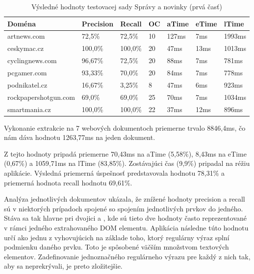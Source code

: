 \begin{table}[hbt]
\caption{Výsledné hodnoty testovacej sady Správy a novinky (prvá časť)}
\centering
\begin{tabular}{|l|l|l|l|l|l|l|}
\hline
\textbf{Doména}          & \textbf{Precision} & \textbf{Recall}  & \textbf{OC}  & \textbf{aTime} & \textbf{eTime} & \textbf{lTime}  \\ \hline
artnews.com             & 72,5\%    & 72,5\%  & 10 & 127ms & 7ms   & 1993ms \\ \hline
ceskymac.cz             & 100,0\%   & 100,0\% & 20 & 47ms  & 13ms  & 1013ms \\ \hline
cyclingnews.com         & 96,67\%   & 72,5\%  & 20 & 88ms  & 7ms   & 781ms  \\ \hline
pcgamer.com             & 93,33\%   & 70,0\%  & 20 & 84ms  & 7ms   & 778ms  \\ \hline
podnikatel.cz           & 16,67\%   & 3,25\%  & 8  & 47ms  & 6ms   & 923ms  \\ \hline
rockpapershotgun.com    & 69,0\%    & 69,0\%  & 25 & 70ms  & 7ms   & 1034ms \\ \hline
smartmania.cz           & 100,0\%   & 100,0\% & 22 & 37ms  & 12ms  & 896ms  \\ \hline
\end{tabular}
\end{table}

Vykonanie extrakcie na 7 webových dokumentoch priemerne trvalo 8846,4ms, čo nám dáva hodnotu 1263,77ms na jeden dokument. 

Z tejto hodnoty pripadá priemerne 70,43ms na aTime (5,58\%), 8,43ms na eTime (0,67\%) a 1059,71ms na lTime (83,85\%). Zostávajúci čas (9,9\%) pripadal na réžiu aplikácie. Výsledná priemerná úspešnosť predstavovala hodnotu 78,31\% a priemerná hodnota recall hodnotu 69,61\%. 

\bigskip

Analýza jednotlivých dokumentov ukázala, že znížené hodnoty precision a recall sú v niektorých prípadoch spojené so spojením jednotlivých prvkov do jedného. Stáva sa tak hlavne pri dvojici  a , kde sú tieto dve hodnoty často reprezentované v rámci jedného extrahovaného DOM elementu. Aplikácia následne túto hodnotu určí ako jednu z vyhovujúcich na základe toho, ktorý regulárny výraz splní podmienku daného prvku. Toto je spôsobené väčším množstvom textových elementov. Zadefinovanie jednoznačného regulárneho výrazu pre každý z nich tak, aby sa neprekrývali, je preto zložitejšie.

